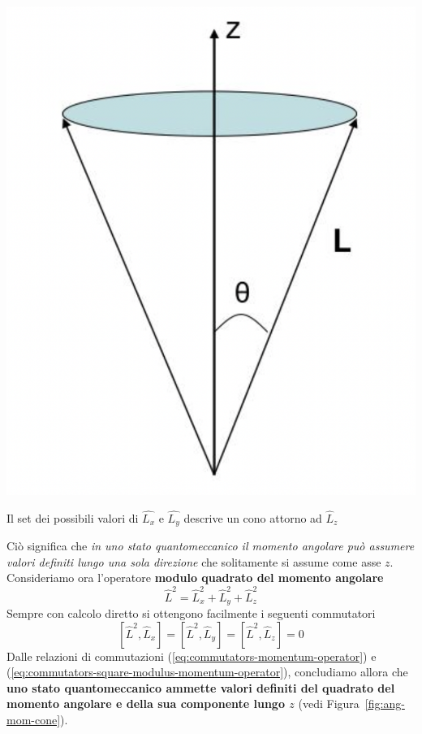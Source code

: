\begin{marginfigure}
	\includegraphics{figs/ang-mom-cone}
	\caption{Il set dei possibili valori di $\hat{L_x}$ e $\hat{L_y}$ descrive un cono attorno ad $\hat{L}_z$}
	\label{fig:ang-mom-cone}
\end{marginfigure}
Ciò significa che \emph{in uno stato quantomeccanico il
	momento angolare può assumere valori definiti lungo una sola direzione}
che solitamente si assume come asse \(z\).
Consideriamo ora l'operatore \textbf{modulo quadrato del momento
	angolare}
\begin{equation}
    \hat{L}^{2} = \hat{L}_{x}^{2} + \hat{L}_{y}^{2} + \hat{L}_{z}^{2}
	\label{eq:square-modulus-momentum-operator}
\end{equation} Sempre con calcolo diretto si ottengono facilmente i seguenti
commutatori
\begin{equation}
    \left[ \hat{L}^{2},\hat{L}_{x}\right] = \left[ \hat{L}^{2},\hat{L}_{y}\right] = \left[ \hat{L}^{2},\hat{L}_{z}\right] = 0
	\label{eq:commutators-square-modulus-momentum-operator}
\end{equation}
Dalle relazioni di commutazioni (\ref{eq:commutators-momentum-operator}) e (\ref{eq:commutators-square-modulus-momentum-operator}),
concludiamo allora che
\textbf{uno stato quantomeccanico ammette valori definiti del quadrato
	del momento angolare e della sua componente lungo \(z\)} (vedi Figura~\ref{fig:ang-mom-cone}).
\bigskip

